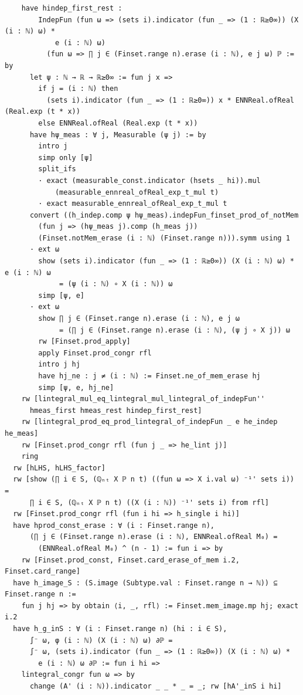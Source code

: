 \begin{lstlisting}
    have hindep_first_rest :
        IndepFun (fun ω => (sets i).indicator (fun _ => (1 : ℝ≥0∞)) (X (i : ℕ) ω) *
            e (i : ℕ) ω)
          (fun ω => ∏ j ∈ (Finset.range n).erase (i : ℕ), e j ω) ℙ := by
      let ψ : ℕ → ℝ → ℝ≥0∞ := fun j x =>
        if j = (i : ℕ) then
          (sets i).indicator (fun _ => (1 : ℝ≥0∞)) x * ENNReal.ofReal (Real.exp (t * x))
        else ENNReal.ofReal (Real.exp (t * x))
      have hψ_meas : ∀ j, Measurable (ψ j) := by
        intro j
        simp only [ψ]
        split_ifs
        · exact (measurable_const.indicator (hsets _ hi)).mul
            (measurable_ennreal_ofReal_exp_t_mul t)
        · exact measurable_ennreal_ofReal_exp_t_mul t
      convert ((h_indep.comp ψ hψ_meas).indepFun_finset_prod_of_notMem
        (fun j => (hψ_meas j).comp (h_meas j))
        (Finset.notMem_erase (i : ℕ) (Finset.range n))).symm using 1
      · ext ω
        show (sets i).indicator (fun _ => (1 : ℝ≥0∞)) (X (i : ℕ) ω) * e (i : ℕ) ω
             = (ψ (i : ℕ) ∘ X (i : ℕ)) ω
        simp [ψ, e]
      · ext ω
        show ∏ j ∈ (Finset.range n).erase (i : ℕ), e j ω
             = (∏ j ∈ (Finset.range n).erase (i : ℕ), (ψ j ∘ X j)) ω
        rw [Finset.prod_apply]
        apply Finset.prod_congr rfl
        intro j hj
        have hj_ne : j ≠ (i : ℕ) := Finset.ne_of_mem_erase hj
        simp [ψ, e, hj_ne]
    rw [lintegral_mul_eq_lintegral_mul_lintegral_of_indepFun''
      hmeas_first hmeas_rest hindep_first_rest]
    rw [lintegral_prod_eq_prod_lintegral_of_indepFun _ e he_indep he_meas]
    rw [Finset.prod_congr rfl (fun j _ => he_lint j)]
    ring
  rw [hLHS, hLHS_factor]
  rw [show (∏ i ∈ S, (ℚₙₜ X ℙ n t) ((fun ω => X i.val ω) ⁻¹' sets i)) =
      ∏ i ∈ S, (ℚₙₜ X ℙ n t) ((X (i : ℕ)) ⁻¹' sets i) from rfl]
  rw [Finset.prod_congr rfl (fun i hi => h_single i hi)]
  have hprod_const_erase : ∀ (i : Finset.range n),
      (∏ j ∈ (Finset.range n).erase (i : ℕ), ENNReal.ofReal M₀) =
        (ENNReal.ofReal M₀) ^ (n - 1) := fun i => by
    rw [Finset.prod_const, Finset.card_erase_of_mem i.2, Finset.card_range]
  have h_image_S : (S.image (Subtype.val : Finset.range n → ℕ)) ⊆ Finset.range n :=
    fun j hj => by obtain ⟨i, _, rfl⟩ := Finset.mem_image.mp hj; exact i.2
  have h_g_inS : ∀ (i : Finset.range n) (hi : i ∈ S),
      ∫⁻ ω, φ (i : ℕ) (X (i : ℕ) ω) ∂ℙ =
      ∫⁻ ω, (sets i).indicator (fun _ => (1 : ℝ≥0∞)) (X (i : ℕ) ω) *
        e (i : ℕ) ω ∂ℙ := fun i hi =>
    lintegral_congr fun ω => by
      change (A' (i : ℕ)).indicator _ _ * _ = _; rw [hA'_inS i hi]
\end{lstlisting}

